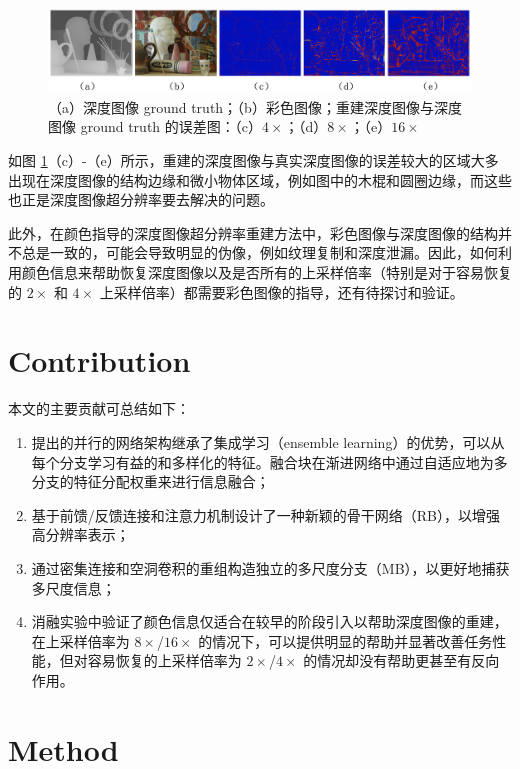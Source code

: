 \documentclass{vip-theme}
\begin{document}
\begin{figure}[!htbp]
\centering
	\includegraphics[width=\textwidth]{figure/motivation}
	\caption{（a）深度图像 ground truth；（b）彩色图像；重建深度图像与深度图像 ground truth 的误差图：（c）$4\times$；（d）$8\times$；（e）$16\times$ }
	\label{fig:motivation}
\end{figure}

如图 \ref{fig:motivation}（c）-（e）所示，重建的深度图像与真实深度图像的误差较大的区域大多出现在深度图像的结构边缘和微小物体区域，例如图中的木棍和圆圈边缘，而这些也正是深度图像超分辨率要去解决的问题。

此外，在颜色指导的深度图像超分辨率重建方法中，彩色图像与深度图像的结构并不总是一致的，可能会导致明显的伪像，例如纹理复制和深度泄漏。因此，如何利用颜色信息来帮助恢复深度图像以及是否所有的上采样倍率（特别是对于容易恢复的 $2\times$ 和 $4\times$ 上采样倍率）都需要彩色图像的指导，还有待探讨和验证。


\section{Contribution}
\label{contribution}

本文的主要贡献可总结如下：
\begin{enumerate}
	
	\item[(1)]	提出的并行的网络架构继承了集成学习（ensemble learning）的优势，可以从每个分支学习有益的和多样化的特征。融合块在渐进网络中通过自适应地为多分支的特征分配权重来进行信息融合；
\item[(2)]	基于前馈/反馈连接和注意力机制设计了一种新颖的骨干网络（RB），以增强高分辨率表示；
\item[(3)]	通过密集连接和空洞卷积的重组构造独立的多尺度分支（MB），以更好地捕获多尺度信息；
\item[(4)]	消融实验中验证了颜色信息仅适合在较早的阶段引入以帮助深度图像的重建，在上采样倍率为 $8\times$/$16\times$ 的情况下，可以提供明显的帮助并显著改善任务性能，但对容易恢复的上采样倍率为 $2\times$/$4\times$ 的情况却没有帮助更甚至有反向作用。
\end{enumerate}


\section{Method}
\label{method}
\end{document}
